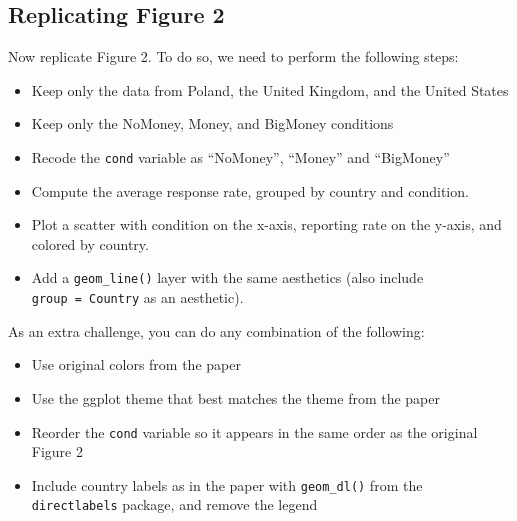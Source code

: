 \documentclass[12pt,halfline,a4paper,]{ouparticle}
\providecommand{\tightlist}{%
  \setlength{\itemsep}{0pt}\setlength{\parskip}{0pt}}
\begin{document}
\hypertarget{replicating-figure-2}{%
\subsection{Replicating Figure 2}\label{replicating-figure-2}}

Now replicate Figure 2. To do so, we need to perform the following
steps:

\begin{itemize}
\tightlist
\item
  Keep only the data from Poland, the United Kingdom, and the United
  States
\item
  Keep only the NoMoney, Money, and BigMoney conditions
\item
  Recode the \texttt{cond} variable as ``NoMoney'', ``Money'' and
  ``BigMoney''
\item
  Compute the average response rate, grouped by country and condition.
\item
  Plot a scatter with condition on the x-axis, reporting rate on the
  y-axis, and colored by country.
\item
  Add a \texttt{geom\_line()} layer with the same aesthetics (also
  include \texttt{group\ =\ Country} as an aesthetic).
\end{itemize}

As an extra challenge, you can do any combination of the following:

\begin{itemize}
\tightlist
\item
  Use original colors from the paper
\item
  Use the ggplot theme that best matches the theme from the paper
\item
  Reorder the \texttt{cond} variable so it appears in the same order as
  the original Figure 2
\item
  Include country labels as in the paper with \texttt{geom\_dl()} from
  the \texttt{directlabels} package, and remove the legend
\end{itemize}
\end{document}
